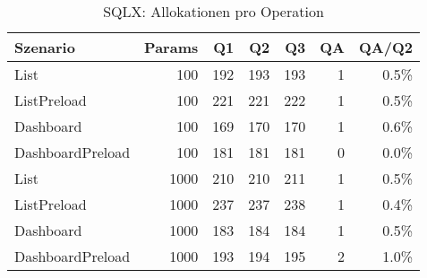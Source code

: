 \begin{table}[ht]
\centering
\caption{SQLX: Allokationen pro Operation}
\begin{tabular}{lrrrrrr}
\toprule
Szenario & Params & Q1 & Q2 & Q3 & QA & QA/Q2 \\
\midrule
		List & 100 & 192 & 193 & 193 & 1 & 0.5\% \\
		ListPreload & 100 & 221 & 221 & 222 & 1 & 0.5\% \\
		Dashboard & 100 & 169 & 170 & 170 & 1 & 0.6\% \\
		DashboardPreload & 100 & 181 & 181 & 181 & 0 & 0.0\% \\
		List & 1000 & 210 & 210 & 211 & 1 & 0.5\% \\
		ListPreload & 1000 & 237 & 237 & 238 & 1 & 0.4\% \\
		Dashboard & 1000 & 183 & 184 & 184 & 1 & 0.5\% \\
		DashboardPreload & 1000 & 193 & 194 & 195 & 2 & 1.0\% \\
\bottomrule
\end{tabular}
\label{tab:benchmark_sqlx_allocsperop}
\end{table}
	